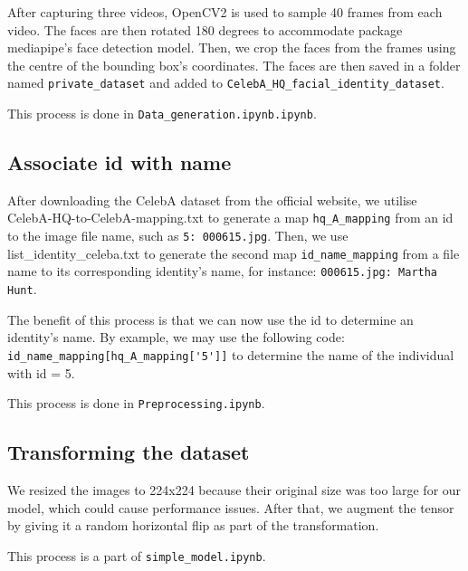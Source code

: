 After capturing three videos, OpenCV2 is used to sample 40 frames from each video. The faces are then rotated 180 degrees to accommodate package mediapipe's face detection model. Then, we crop the faces from the frames using the centre of the bounding box's coordinates. The faces are then saved in a folder named \verb|private_dataset| and added to \verb|CelebA_HQ_facial_identity_dataset|.

This process is done in \verb|Data_generation.ipynb.ipynb|.


\subsection{Associate id with name}

After downloading the CelebA dataset from the official website, we utilise CelebA-HQ-to-CelebA-mapping.txt to generate a map \verb|hq_A_mapping| from an id to the image file name, such as \verb|5: 000615.jpg|.
Then, we use list\_identity\_celeba.txt to generate the second map \verb|id_name_mapping| from a file name to its corresponding identity's name, for instance: \verb|000615.jpg: Martha Hunt|.

The benefit of this process is that we can now use the id to determine an identity's name. By example, we may use the following code: \verb|id_name_mapping[hq_A_mapping['5']]| to determine the name of the individual with id = 5.

This process is done in \verb|Preprocessing.ipynb|.

\subsection{Transforming the dataset}

We resized the images to 224x224 because their original size was too large for our model, which could cause performance issues. After that, we augment the tensor by giving it a random horizontal flip as part of the transformation.

This process is a part of \verb|simple_model.ipynb|.
